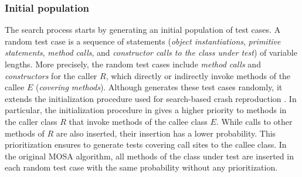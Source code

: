\subsubsection{Initial population}
The search process starts by generating an initial population of test cases. A random test case is a sequence of statements (\textit{object instantiations}, \textit{primitive statements}, \textit{method calls}, and \textit{constructor calls to the class under test}) of variable lengths. More precisely, the random test cases include \textit{method calls} and \textit{constructors} for the caller $R$, which directly or indirectly invoke methods of the callee $E$ (\textit{covering methods}). Although \integration generates these test cases randomly, it extends the initialization procedure used for search-based crash reproduction \cite{soltani2017}. In particular, the initialization procedure in \cling gives a higher priority to methods in the caller class $R$ that invoke methods of the callee class $E$. While calls to other methods of $R$ are also inserted, their insertion has a lower probability. This prioritization ensures to generate tests covering call sites to the callee class. In the original MOSA algorithm, all methods of the class under test are inserted in each random test case with the same probability without any prioritization.


